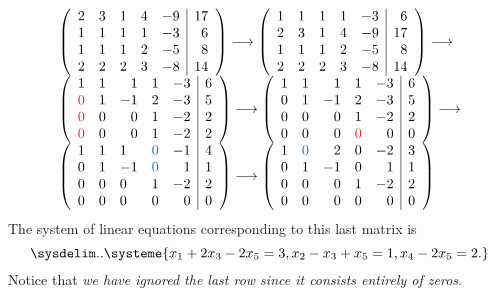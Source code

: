 \[
\begin{array}{l}
    \left(\begin{array}{rrrrr|r}
        2 & 3 & 1 & 4 & -9 & 17 \\
        1 & 1 & 1 & 1 & -3 & 6 \\
        1 & 1 & 1 & 2 & -5 & 8 \\
        2 & 2 & 2 & 3 & -8 & 14
    \end{array}\right) 
    \longrightarrow
    \left(\begin{array}{rrrrr|r}
        1 & 1 & 1 & 1 & -3 & 6 \\
        2 & 3 & 1 & 4 & -9 & 17 \\
        1 & 1 & 1 & 2 & -5 & 8 \\
        2 & 2 & 2 & 3 & -8 & 14
    \end{array}\right)
    \longrightarrow \\
    \left(\begin{array}{rrrrr|r}
        1 & 1 & 1 & 1 & -3 & 6 \\
        \RED{0} & 1 & -1 & 2 & -3 & 5 \\
        \RED{0} & 0 & 0 & 1 & -2 & 2 \\
        \RED{0} & 0 & 0 & 1 & -2 & 2
    \end{array}\right) 
    \longrightarrow
    \left(\begin{array}{rrrrr|r}
        1 & 1 & 1 & 1 & -3 & 6 \\
        0 & 1 & -1 & 2 & -3 & 5 \\
        0 & 0 & 0 & 1 & -2 & 2 \\
        0 & 0 & 0 & \RED{0} & 0 & 0
    \end{array}\right)
    \longrightarrow \\
    \left(\begin{array}{llllr|r}
        1 & 1 & 1 & \BLUE{0} & -1 & 4 \\
        0 & 1 & -1 & \BLUE{0} & 1 & 1 \\
        0 & 0 & 0 & 1 & -2 & 2 \\
        0 & 0 & 0 & 0 & 0 & 0
    \end{array}\right)
    \longrightarrow
    \left(\begin{array}{rrrrr|r}
        1 & \BLUE{0} & 2 & 0 & -2 & 3 \\
        0 & 1 & -1 & 0 & 1 & 1 \\
        0 & 0 & 0 & 1 & -2 & 2 \\
        0 & 0 & 0 & 0 & 0 & 0
    \end{array}\right)
\end{array}
\]
The system of linear equations corresponding to this last matrix is
\[
    \sysdelim..\systeme{
        x_1 + 2 x_3 - 2 x_5 = 3,
        x_2 - x_3 + x_5 = 1,
        x_4 - 2 x_5 = 2.
    }
\]
Notice that \emph{we have ignored the last row since it consists entirely of zeros}.

